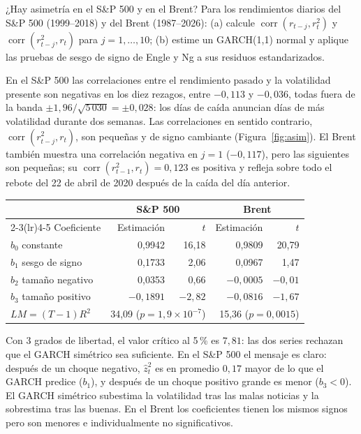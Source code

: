 \begin{ejresuelto}{¿Hay asimetría en el S\&P 500 y en el Brent?}\label{ej:asim}
\enunciado Para los rendimientos diarios del S\&P 500 (1999--2018) y del Brent (1987--2026): (a) calcule
$\operatorname{corr}(r_{t-j},r_t^2)$ y $\operatorname{corr}(r_{t-j}^2,r_t)$ para $j=1,\dots,10$; (b) estime un
GARCH(1,1) normal y aplique las pruebas de sesgo de signo de Engle y Ng a sus residuos estandarizados.

\solucion
{} En el S\&P 500 las correlaciones entre el rendimiento pasado y la
volatilidad presente son negativas en los diez rezagos, entre $-0{,}113$ y $-0{,}036$, todas fuera de la
banda $\pm1{,}96/\sqrt{5\,030}=\pm0{,}028$: los días de caída anuncian días de más volatilidad durante dos
semanas. Las correlaciones en sentido contrario, $\operatorname{corr}(r_{t-j}^2,r_t)$, son pequeñas y de signo
cambiante (Figura~\ref{fig:asim}). El Brent también muestra una correlación negativa en $j=1$ ($-0{,}117$), pero
las siguientes son pequeñas; su $\operatorname{corr}(r_{t-1}^2,r_t)=0{,}123$ es positiva y refleja sobre todo el
rebote del 22 de abril de 2020 después de la caída del día anterior.

\begin{center}\small
\begin{tabular}{@{}lrrrr@{}}
\toprule
 & \multicolumn{2}{c}{S\&P 500} & \multicolumn{2}{c}{Brent} \\
\cmidrule(lr){2-3}\cmidrule(lr){4-5}
Coeficiente & Estimación & $t$ & Estimación & $t$ \\
\midrule
$b_0$ constante             & 0,9942 & 16,18 & 0,9809 & 20,79 \\
$b_1$ sesgo de signo        & 0,1733 & 2,06 & 0,0967 & 1,47 \\
$b_2$ tamaño negativo       & 0,0353 & 0,66 & $-0{,}0005$ & $-0{,}01$ \\
$b_3$ tamaño positivo       & $-0{,}1891$ & $-2{,}82$ & $-0{,}0816$ & $-1{,}67$ \\
\midrule
$LM=(T-1)R^2$               & \multicolumn{2}{r}{34,09 ($p=1{,}9\times10^{-7}$)} & \multicolumn{2}{r}{15,36 ($p=0{,}0015$)} \\
\bottomrule
\end{tabular}
\end{center}
Con 3 grados de libertad, el valor crítico al 5\,\% es $7{,}81$: las dos series rechazan que el GARCH simétrico
sea suficiente. En el S\&P 500 el mensaje es claro: después de un choque negativo, $\hat z_t^2$ es en promedio
$0{,}17$ mayor de lo que el GARCH predice ($b_1$), y después de un choque positivo grande es menor ($b_3<0$). El
GARCH simétrico subestima la volatilidad tras las malas noticias y la sobrestima tras las buenas. En el Brent los
coeficientes tienen los mismos signos pero son menores e individualmente no significativos.


\end{ejresuelto}
